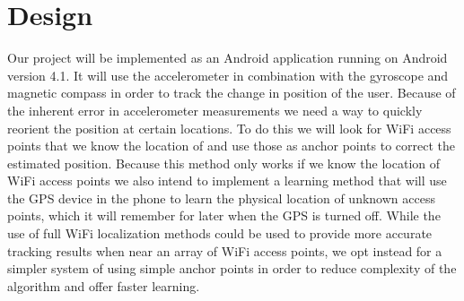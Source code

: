 \section{Design}
\label{sec:design}

Our project will be implemented as an Android application running on Android version 4.1. 
It will use the accelerometer in combination with the gyroscope and magnetic compass in order to track the change in position of the user.
Because of the inherent error in accelerometer measurements we need a way to quickly reorient the position at certain locations. 
To do this we will look for WiFi access points that we know the location of and use those as anchor points to correct the estimated position. 
Because this method only works if we know the location of WiFi access points we also intend to implement a learning method that will use the GPS device in the phone to learn the physical location of unknown access points, which it will remember for later when the GPS is turned off. 
While the use of full WiFi localization methods could be used to provide more accurate tracking results when near an array of WiFi access points, we opt instead for a simpler system of using simple anchor points in order to reduce complexity of the algorithm and offer faster learning. 